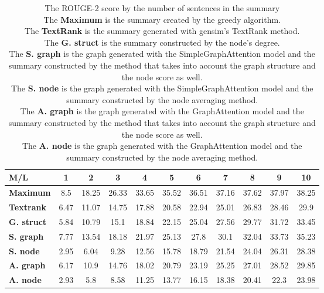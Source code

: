 \begin{table}[!ht]
	\centering
	\begin{tabular}{| l | c | c | c | c | c | c | c | c | c | c |}
		\hline
		\textbf{M/L}&\textbf{1}&\textbf{2}&\textbf{3}&\textbf{4}&\textbf{5}&\textbf{6}&\textbf{7}&\textbf{8}&\textbf{9}&\textbf{10} \\ \hline \hline
		\textbf{Maximum}&8.5&18.25&26.33&33.65&35.52&36.51&37.16&37.62&37.97&38.25 \\ \hline
		\textbf{Textrank}&6.47&11.07&14.75&17.88&20.58&22.94&25.01&26.83&28.46&29.9 \\ \hline
		\textbf{G. struct}&5.84&10.79&15.1&18.84&22.15&25.04&27.56&29.77&31.72&33.45 \\ \hline
		\textbf{S. graph}&7.77&13.54&18.18&21.97&25.13&27.8&30.1&32.04&33.73&35.23 \\ \hline
		\textbf{S. node}&2.95&6.04&9.28&12.56&15.78&18.79&21.54&24.04&26.31&28.38 \\ \hline
		\textbf{A. graph}&6.17&10.9&14.76&18.02&20.79&23.19&25.25&27.01&28.52&29.85 \\ \hline
		\textbf{A. node}&2.93&5.8&8.58&11.25&13.77&16.15&18.38&20.41&22.3&23.98 \\ \hline
	\end{tabular}
	\caption{The ROUGE-2 score by the number of sentences in the summary
		\\ The \textbf{Maximum} is the summary created by the greedy algorithm.
		\\ The \textbf{TextRank} is the summary generated with gensim's TextRank method. 
		\\The \textbf{G. struct} is the summary constructed by the node's degree.
		\\ The \textbf{S. graph} is the graph generated with the SimpleGraphAttention model and the summary constructed by the method that takes into account the graph structure and the node score as well.
		\\ The \textbf{S. node} is the graph generated with the SimpleGraphAttention model and the summary constructed by the node averaging method.
		\\ The \textbf{A. graph} is the graph generated with the GraphAttention model and the summary constructed by the method that takes into account the graph structure and the node score as well.
		\\ The \textbf{A. node} is the graph generated with the GraphAttention model and the summary constructed by the node averaging method.}
	\label{tab:ROUGE-2}
\end{table}

